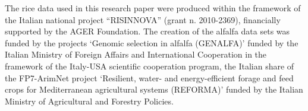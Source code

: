  
\makeatletter{}\begin{acknowledgements}
The rice data used in this research paper were produced within the framework of the Italian national project ``RISINNOVA'' (grant n. 2010-2369), financially supported by the AGER Foundation.
The creation of the alfalfa data sets was funded by the projects ‘Genomic selection in alfalfa (GENALFA)’ funded by the Italian Ministry of Foreign Affairs and International Cooperation in the framework of the Italy-USA scientific cooperation program, the Italian share of the FP7-ArimNet project ‘Resilient, water- and energy-efficient forage and feed crops for Mediterranean agricultural systems (REFORMA)’ funded by the Italian Ministry of Agricultural and Forestry Policies.
\end{acknowledgements}


 

      
   


